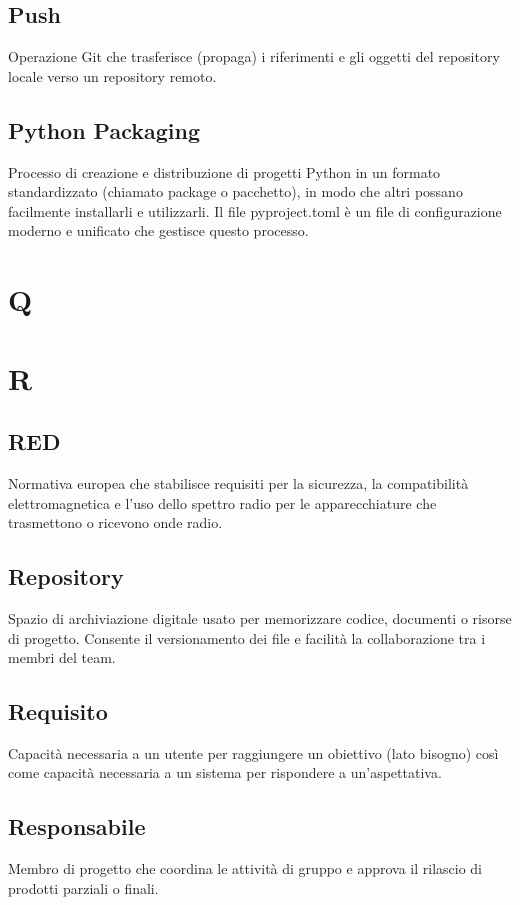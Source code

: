 \documentclass[a4paper,12pt]{article}
\begin{document}
          \subsection*{Push}
			Operazione Git che trasferisce (propaga) i riferimenti e gli oggetti del repository locale verso un repository remoto.
          \subsection*{Python Packaging}
			Processo di creazione e distribuzione di progetti Python in un formato standardizzato (chiamato package o pacchetto), in modo che altri possano facilmente installarli e utilizzarli. Il file pyproject.toml è un file di configurazione moderno e unificato che gestisce questo processo.
        
\newpage
        \section{Q}
        
\newpage
      
        \section{R}
        
          \subsection*{RED}
			Normativa europea che stabilisce requisiti per la sicurezza, la compatibilità elettromagnetica e l'uso dello spettro radio per le apparecchiature che trasmettono o ricevono onde radio.
          \subsection*{Repository}
			Spazio di archiviazione digitale usato per memorizzare codice, documenti o risorse di progetto. Consente il versionamento dei file e facilità la collaborazione tra i membri del team.
          \subsection*{Requisito}
			Capacità necessaria a un utente per raggiungere un obiettivo (lato bisogno) così come capacità necessaria a un sistema per rispondere a un'aspettativa.
          \subsection*{Responsabile}
			Membro di progetto che coordina le attività di gruppo e approva il rilascio di prodotti parziali o finali.
\end{document}
